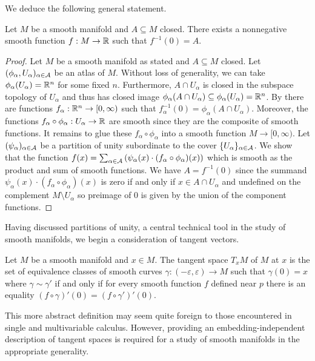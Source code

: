 We deduce the following general statement. 
\begin{theorem}\label{thm: closed subset is level set of smooth manifold}
    Let $M$ be a smooth manifold and $A\subseteq M$ closed. There exists a nonnegative smooth function $f:M\to\mathbb{R}$ such that $f^{-1}(0)=A$. 
\end{theorem}
\begin{proof}
    Let $M$ be a smooth manifold as stated and $A\subseteq M$ closed. Let $(\phi_{\alpha},U_{\alpha})_{\alpha\in\mathcal{A}}$ be an atlas of $M$. Without loss of generality, we can take $\phi_{\alpha}(U_{\alpha})=\mathbb{R}^{n}$ for some fixed $n$. Furthermore, $A\cap U_{\alpha}$ is closed in the subspace topology of $U_{\alpha}$ and thus has closed image $\phi_{\alpha}(A\cap U_{\alpha})\subseteq\phi_{\alpha}(U_{\alpha})=\mathbb{R}^{n}$. By  there are functions $f_{\alpha}:\mathbb{R}^{n}\to[0,\infty)$ such that $f^{-1}_{\alpha}(0)=\phi_{\alpha}(A\cap U_{\alpha})$. Moreover, the functions $f_{\alpha}\circ\phi_{\alpha}:U_{\alpha}\to\mathbb{R}$ are smooth since they are the composite of smooth functions. It remains to glue these $f_{\alpha}\circ\phi_{\alpha}$ into a smooth function $M\to[0,\infty)$. Let $(\psi_{\alpha})_{\alpha\in\mathcal{A}}$ be a partition of unity subordinate to the cover $\{U_{\alpha}\}_{\alpha\in\mathcal{A}}$. We show that the function $f(x)=\sum_{\alpha\in\mathcal{A}}\left(\psi_{\alpha}(x)\cdot(f_{\alpha}\circ\phi_{\alpha})(x)\right)$ which is smooth as the product and sum of smooth functions. We have $A=f^{-1}(0)$ since the summand $\psi_{\alpha}(x)\cdot (f_{\alpha}\circ\phi_{\alpha})(x)$ is zero if and only if $x\in A\cap U_{\alpha}$ and undefined on the complement $M\setminus U_{\alpha}$ so preimage of 0 is given by the union of the component functions.
\end{proof}
Having discussed partitions of unity, a central technical tool in the study of smooth manifolds, we begin a consideration of tangent vectors. 
\begin{definition}\label{def: tangent space}
    Let $M$ be a smooth manifold and $x\in M$. The tangent space $T_{x}M$ of $M$ at $x$ is the set of equivalence classes of smooth curves $\gamma:(-\varepsilon,\varepsilon)\to M$ such that $\gamma(0)=x$ where $\gamma\sim\gamma'$ if and only if for every smooth function $f$ defined near $p$ there is an equality $(f\circ\gamma)'(0)=(f\circ\gamma')'(0)$. 
\end{definition}
\begin{remark}
    This more abstract definition may seem quite foreign to those encountered in single and multivariable calculus. However, providing an embedding-independent description of tangent spaces is required for a study of smooth manifolds in the appropriate generality. 
\end{remark}
